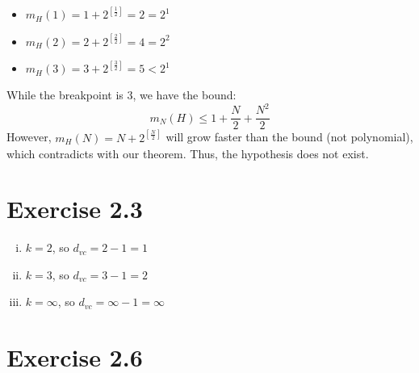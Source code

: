 \documentclass{article}
\def\math#1{$#1$}
\begin{document}
\begin{enumerate}[a)]
        \begin{itemize}
            \item \math{m_H(1) = 1 + 2^{[\frac{1}{2}]} = 2 = 2^1}
            \item \math{m_H(2) = 2 + 2^{[\frac{2}{2}]} = 4 = 2^2}
            \item \math{m_H(3) = 3 + 2^{[\frac{3}{2}]} = 5 < 2^1}
        \end{itemize}
        While the breakpoint is 3, we have the bound:
        \begin{equation}
            m_N(H) \leq 1 + \frac{N}{2} + \frac{N^2}{2}
        \end{equation}
        However, \math{m_H(N) = N + 2^{[\frac{N}{2}]}} will grow faster than the bound (not polynomial), which contradicts with our theorem. Thus, the hypothesis does not exist.
\end{enumerate}


\section{Exercise 2.3}

\begin{enumerate}[i)]
    \item \math{k = 2}, so \math{d_{vc} = 2 - 1 = 1}
    \item \math{k = 3}, so \math{d_{vc} = 3 - 1 = 2}
    \item \math{k = \infty}, so \math{d_{vc} = \infty - 1 = \infty}
\end{enumerate}

\section{Exercise 2.6}
\end{document}
